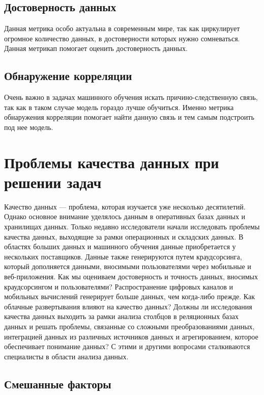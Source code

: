 \documentclass{article}
\begin{document}
\subsection{Достоверность данных}

Данная метрика особо актуальна в современным мире, так как циркулирует огромное количество данных, в достоверности которых нужно сомневаться. Данная метрикап помогает оценить достоверность данных.

\subsection{Обнаружение корреляции}

Очень важно в задачах машинного обучения искать причино-следственную связь, так как в таком случае модель гораздо лучше обучиться. Именно метрика обнаружения корреляции помогает найти данную связь и тем самым подстроить под нее модель.

\newpage

\section{Проблемы качества данных при решении задач}

Качество данных — проблема, которая изучается уже несколько десятилетий. Однако основное внимание уделялось данным в оперативных базах данных и хранилищах данных. Только недавно исследователи начали исследовать проблемы качества данных, выходящие за рамки операционных и складских данных. 
В областях больших данных и машинного обучения данные приобретается у нескольких поставщиков. Данные также генерируются путем краудсорсинга, который дополняется данными, вносимыми пользователями через мобильные и веб-приложения. Как мы оцениваем достоверность и точность данных, вносимых краудсорсингом и пользователями? Распространение цифровых каналов и мобильных вычислений генерирует больше данных, чем когда-либо прежде. Как облачные развертывания влияют на качество данных? Должны ли исследования качества данных выходить за рамки анализа столбцов в реляционных базах данных и решать проблемы, связанные со сложными преобразованиями данных, интеграцией данных из различных источников данных и агрегированием, которое обеспечивает понимание данных? С этими и другими вопросами сталкиваются специалисты в области анализа данных.

\subsection{Смешанные факторы}
\end{document}
